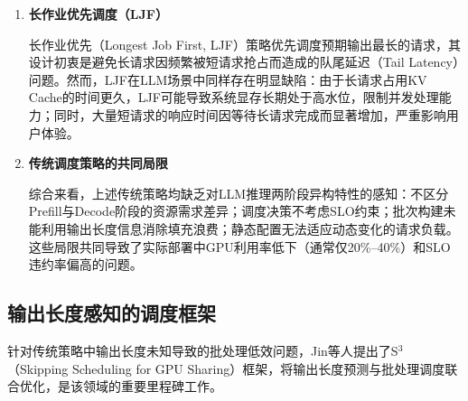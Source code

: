 \begin{enumerate}
\item \textbf{长作业优先调度（LJF）}

长作业优先（Longest Job First, LJF）策略优先调度预期输出最长的请求，其设计初衷是避免长请求因频繁被短请求抢占而造成的队尾延迟（Tail Latency）问题。然而，LJF在LLM场景中同样存在明显缺陷：由于长请求占用KV Cache的时间更久，LJF可能导致系统显存长期处于高水位，限制并发处理能力；同时，大量短请求的响应时间因等待长请求完成而显著增加，严重影响用户体验。

\item \textbf{传统调度策略的共同局限}

综合来看，上述传统策略均缺乏对LLM推理两阶段异构特性的感知：不区分Prefill与Decode阶段的资源需求差异；调度决策不考虑SLO约束；批次构建未能利用输出长度信息消除填充浪费；静态配置无法适应动态变化的请求负载。这些局限共同导致了实际部署中GPU利用率低下（通常仅20\%--40\%）和SLO违约率偏高的问题\cite{he2024uellm}。

\end{enumerate}

\subsection{输出长度感知的调度框架}

针对传统策略中输出长度未知导致的批处理低效问题，Jin等人\cite{jin2023s3}提出了S$^3$（Skipping Scheduling for GPU Sharing）框架，将输出长度预测与批处理调度联合优化，是该领域的重要里程碑工作。

